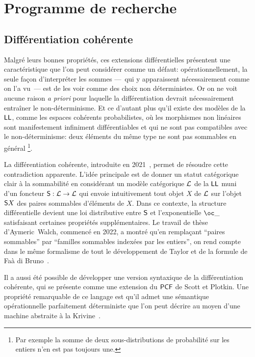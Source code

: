 \documentclass[a4]{article}
\begin{document}

\section*{Programme de recherche}

\subsection*{Différentiation cohérente}
Malgré leurs bonnes propriétés, ces extensions différentielles
présentent une caractéristique que l'on peut considérer comme un
défaut: opérationnellement, la seule façon d'interpréter les sommes
---~qui y apparaissent nécessairement comme on l'a vu~--- est de les
voir comme des choix non déterministes.
%
Or on ne voit aucune raison \emph{a priori} pour laquelle la
différentiation devrait nécessairement entraîner le non-déterminisme.
%
Et ce d'autant plus qu'il existe des modèles de la $\hbox{\textsf{LL}}$, comme les
espaces cohérents probabilistes, où les morphismes non linéaires sont
manifestement infiniment différentiables et qui ne sont pas
compatibles avec le non-déterminisme: deux éléments du même type ne
sont pas sommables en général%
\footnote{Par exemple la somme de deux sous-distributions de probabilité sur
  les entiers n'en est pas toujours une.}.

La différentiation cohérente, introduite en 2021~\cite{Ehrhard23a},
permet de résoudre cette contradiction apparente.
%
L'idée principale est de donner un statut catégorique clair à la
sommabilité en considérant un modèle catégorique $\mathcal{L}$ de la $\hbox{\textsf{LL}}$
muni d'un foncteur ${\mathsf S}:\mathcal{L}\to\mathcal{L}$ qui envoie intuitivement tout
objet $X$ de $\mathcal{L}$ sur l'objet ${\mathsf S} X$ des paires sommables
d'éléments de $X$.
%
Dans ce contexte, la structure différentielle devient une loi
distributive entre ${\mathsf S}$ et l'exponentielle $\Oc\_$ satisfaisant
certaines propriétés supplémentaires.
%
Le travail de thèse d'Aymeric~Walch, commencé en 2022, a montré qu'en
remplaçant ``paires sommables'' par ``familles sommables indexées par
les entiers'', on rend compte dans le même formalisme de tout le
développement de Taylor et de la formule de Faà di
Bruno~\cite{EhrhardWalch23b}.

Il a aussi été possible de développer une version syntaxique de la
différentiation cohérente, qui se présente comme une extension du
$\mathsf{PCF}$ de Scott et Plotkin.
%
Une propriété remarquable de ce langage est qu'il admet une sémantique
opérationnelle parfaitement déterministe que l'on peut décrire au
moyen d'une machine abstraite à la Krivine~\cite{Ehrhard23b}.
%
\end{document}
